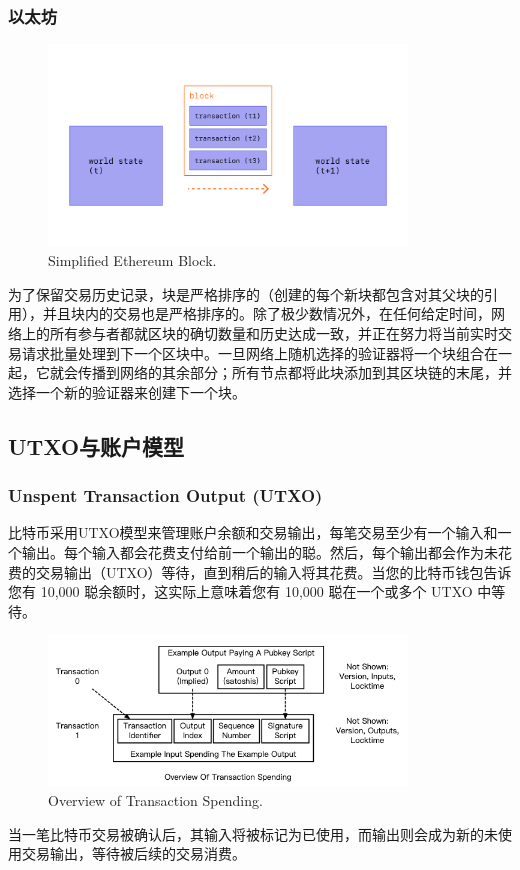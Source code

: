 \documentclass{article}
\begin{document}
\subsubsection{以太坊}
\begin{figure}[h]
\centering
\includegraphics[width=0.85\textwidth]{eth_block.png}
\caption{\label{fig:eth_block}Simplified Ethereum Block.}
\end{figure}
\par 为了保留交易历史记录，块是严格排序的（创建的每个新块都包含对其父块的引用），并且块内的交易也是严格排序的。除了极少数情况外，在任何给定时间，网络上的所有参与者都就区块的确切数量和历史达成一致，并正在努力将当前实时交易请求批量处理到下一个区块中。一旦网络上随机选择的验证器将一个块组合在一起，它就会传播到网络的其余部分；所有节点都将此块添加到其区块链的末尾，并选择一个新的验证器来创建下一个块。\cite{ethpaper}
\subsection{UTXO与账户模型}
\subsubsection{Unspent Transaction Output (UTXO)}
\par 比特币采用UTXO模型来管理账户余额和交易输出，每笔交易至少有一个输入和一个输出。每个输入都会花费支付给前一个输出的聪。然后，每个输出都会作为未花费的交易输出（UTXO）等待，直到稍后的输入将其花费。当您的比特币钱包告诉您有 10,000 聪余额时，这实际上意味着您有 10,000 聪在一个或多个 UTXO 中等待。
\begin{figure}[h]
\centering
\includegraphics[width=0.85\textwidth]{utxo.png}
\caption{\label{fig:utxo}Overview of Transaction Spending.}
\end{figure}
\par 当一笔比特币交易被确认后，其输入将被标记为已使用，而输出则会成为新的未使用交易输出，等待被后续的交易消费。
\end{document}
